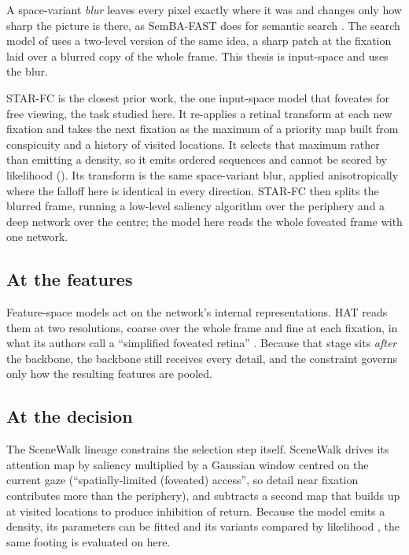 A space-variant \emph{blur} leaves every pixel exactly where it was and changes only
how sharp the picture is there, as SemBA-FAST does for semantic search \citep{luzio2025semba}. The search
model of \citet{yang2020predicting} uses a two-level version of the same idea, a sharp patch at the
fixation laid over a blurred copy of the whole frame. This thesis is input-space and uses the blur.

STAR-FC \citep{wloka2018starfc} is the closest prior work, the one input-space model that foveates for
free viewing, the task studied here. It re-applies a retinal transform at each new fixation and takes the
next fixation as the maximum of a priority map built from conspicuity and a history of visited locations.
It selects that maximum rather than emitting a density, so it emits ordered sequences and cannot be
scored by likelihood (). Its transform is the same space-variant blur, applied
anisotropically where the falloff here is identical in every direction. STAR-FC then splits the blurred
frame, running a low-level saliency algorithm over the periphery and a deep network over the centre; the
model here reads the whole foveated frame with one network.

\subsection{At the features}
\label{subsec:fov-features}

Feature-space models act on the network's internal representations. HAT reads
them at two resolutions, coarse over the whole frame and fine at each fixation, in what its authors call
a \enquote{simplified foveated retina} \citep{yang2024hat}. Because that stage sits \emph{after} the backbone,
the backbone still receives every detail, and the constraint governs only how the resulting features are
pooled.

\subsection{At the decision}
\label{subsec:fov-decision}

The SceneWalk lineage \citep{engbert2015scenewalk, schwetlick2019ccn, schwetlick2023diss} constrains the
selection step itself. SceneWalk drives its attention map by saliency
multiplied by a Gaussian window centred on the current gaze (\enquote{spatially-limited (foveated)
access}, so detail near fixation contributes more than the periphery), and subtracts a second map that
builds up at visited
locations to produce inhibition of return. Because the model emits a density, its parameters can be
fitted and its variants compared by likelihood \citep{schuett2017likelihood}, the same footing \dg{} is
evaluated on here.

